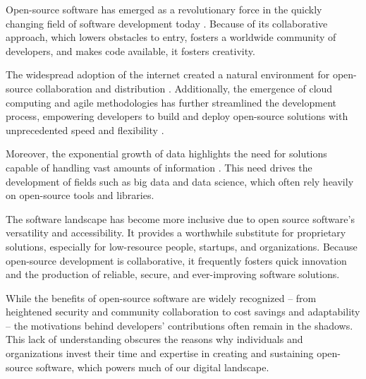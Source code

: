 

Open-source software has emerged as a revolutionary force in the quickly changing field of software development today \citep{fitzgerald2006transformation}. Because of its collaborative approach, which lowers obstacles to entry, fosters a worldwide community of developers, and makes code available, it fosters creativity.

The widespread adoption of the internet created a natural environment for open-source collaboration and distribution \citep{schweik2012internet}. Additionally, the emergence of cloud computing and agile methodologies has further streamlined the development process, empowering developers to build and deploy open-source solutions with unprecedented speed and flexibility \citep{raj2013envisioning}.

Moreover, the exponential growth of data highlights the need for solutions capable of handling vast amounts of information \citep{berman2013principles}. This need drives the development of fields such as big data and data science, which often rely heavily on open-source tools and libraries.

The software landscape has become more inclusive due to open source software's versatility and accessibility. It provides a worthwhile substitute for proprietary solutions, especially for low-resource people, startups, and organizations. Because open-source development is collaborative, it frequently fosters quick innovation and the production of reliable, secure, and ever-improving software solutions.


While the benefits of open-source software are widely recognized – from heightened security and community collaboration to cost savings and adaptability – the motivations behind developers' contributions often remain in the shadows. This lack of understanding obscures the reasons why individuals and organizations invest their time and expertise in creating and sustaining open-source software, which powers much of our digital landscape.

